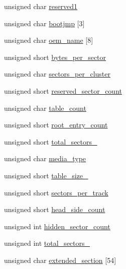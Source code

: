 \begin{DoxyCompactItemize}
\item 
unsigned char \hyperlink{a00152_affe215a7220b2d52fb9dacf3b35e56dc_affe215a7220b2d52fb9dacf3b35e56dc}{reserved1}
\item 
unsigned char \hyperlink{a00152_a9d09d7d5af910f75a499a71fc8db1cb1_a9d09d7d5af910f75a499a71fc8db1cb1}{bootjmp} \mbox{[}3\mbox{]}
\item 
unsigned char \hyperlink{a00152_aad08c3f8e8a444d492cc77be16a79d86_aad08c3f8e8a444d492cc77be16a79d86}{oem\+\_\+name} \mbox{[}8\mbox{]}
\item 
unsigned short \hyperlink{a00152_a383840c631d2e9d53e46b6bc5d17c3eb_a383840c631d2e9d53e46b6bc5d17c3eb}{bytes\+\_\+per\+\_\+sector}
\item 
unsigned char \hyperlink{a00152_a78e26c23d518983e13881d4e0e53356a_a78e26c23d518983e13881d4e0e53356a}{sectors\+\_\+per\+\_\+cluster}
\item 
unsigned short \hyperlink{a00152_af819ceb3bec79135b7de34a0b973f085_af819ceb3bec79135b7de34a0b973f085}{reserved\+\_\+sector\+\_\+count}
\item 
unsigned char \hyperlink{a00152_afc6604c21ae7038b249589ecd0560622_afc6604c21ae7038b249589ecd0560622}{table\+\_\+count}
\item 
unsigned short \hyperlink{a00152_a7d8c3eb5a95ebc9f53ef60d1e802e8a8_a7d8c3eb5a95ebc9f53ef60d1e802e8a8}{root\+\_\+entry\+\_\+count}
\item 
unsigned short \hyperlink{a00152_ab6c9ebaa0ea252eb5692e3d7dc426f46_ab6c9ebaa0ea252eb5692e3d7dc426f46}{total\+\_\+sectors\+\_}
\item 
unsigned char \hyperlink{a00152_ab90dc4a72adfaa3c57712df0dab86154_ab90dc4a72adfaa3c57712df0dab86154}{media\+\_\+type}
\item 
unsigned short \hyperlink{a00152_ade6f19059c505e2818913816bd8392b3_ade6f19059c505e2818913816bd8392b3}{table\+\_\+size\+\_}
\item 
unsigned short \hyperlink{a00152_a602ee4dea0c5142e60ebabb37adf3dd9_a602ee4dea0c5142e60ebabb37adf3dd9}{sectors\+\_\+per\+\_\+track}
\item 
unsigned short \hyperlink{a00152_a33263a0ce9b20cca4a493c961a5ade52_a33263a0ce9b20cca4a493c961a5ade52}{head\+\_\+side\+\_\+count}
\item 
unsigned int \hyperlink{a00152_a0c59c66983eef3ab335aed301b09c3ba_a0c59c66983eef3ab335aed301b09c3ba}{hidden\+\_\+sector\+\_\+count}
\item 
unsigned int \hyperlink{a00152_a0eb25939eb0c1c4ff72bfec5677e78c2_a0eb25939eb0c1c4ff72bfec5677e78c2}{total\+\_\+sectors\+\_}
\item 
unsigned char \hyperlink{a00152_aac6b462ea9420b07d31ee647d2fb5a21_aac6b462ea9420b07d31ee647d2fb5a21}{extended\+\_\+section} \mbox{[}54\mbox{]}
\end{DoxyCompactItemize}


